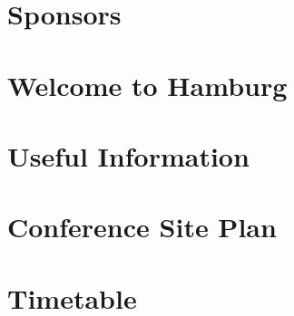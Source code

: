 \documentclass[openany, parskip=full, 12pt, a4]{scrbook}
\begin{document}

	
	
% 


\chapter{Sponsors}



\chapter{Welcome to Hamburg}



\tableofcontents


\chapter{Useful Information}
% 


\chapter{Conference Site Plan}



\chapter{Timetable}
% 



\end{document}
